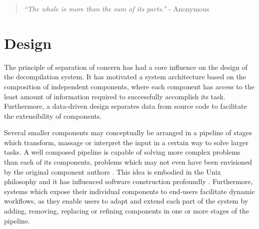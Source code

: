 
%

\begin{quote}
	\textit{``The whole is more than the sum of its parts.''} - Anonymous
\end{quote}

\section{Design}
\label{sec:design}

The principle of separation of concern has had a core influence on the design of the decompilation system. It has motivated a system architecture based on the composition of independent components, where each component has access to the least amount of information required to successfully accomplish its task. Furthermore, a data-driven design separates data from source code to facilitate the extensibility of components.

Several smaller components may conceptually be arranged in a pipeline of stages which transform, massage or interpret the input in a certain way to solve larger tasks. A well composed pipeline is capable of solving more complex problems than each of its components, problems which may not even have been envisioned by the original component authors \cite{simplicity_and_collaboration}. This idea is embodied in the Unix philosophy and it has influenced software construction profoundly \cite{art_of_unix}. Furthermore, systems which expose their individual components to end-users facilitate dynamic workflows, as they enable users to adapt and extend each part of the system by adding, removing, replacing or refining components in one or more stages of the pipeline.


%

